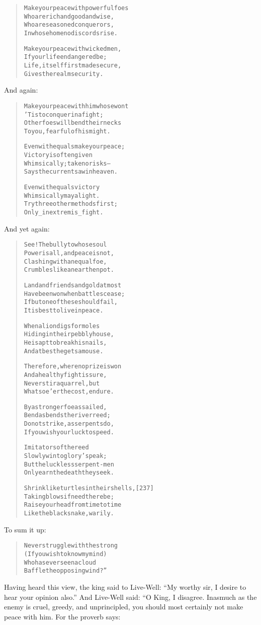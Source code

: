 \documentclass[article, twoside, 14pt]{memoir}
\renewenvironment{verbatim}{%
\begin{quote}%
\vskip -10pt%
\begin{alltt}\normalfont\large}{\end{alltt}%
\end{quote}%
\vskip -10pt
} %
\begin{document}
\begin{verbatim}
Make your peace with powerful foes
    Who are rich and good and wise,
Who are seasoned conquerors,
In whose home no discords rise.

Make your peace with wicked men,
    If your life endangered be;
Life, itself first made secure,
    Gives the realm security.
\end{verbatim}
And again:

\begin{verbatim}
Make your peace with him whose wont
    'Tis to conquer in a fight;
Other foes will bend their necks
    To you, fearful of his might.

Even with equals make your peace;
    Victory is often given
Whimsically; take no risks--
    Says the current saw in heaven.

Even with equals victory
    Whimsically may alight.
Try three other methods first;
    Only _in extremis_ fight.
\end{verbatim}
And yet again:

\begin{verbatim}
See! The bully to whose soul
    Power is all, and peace is not,
Clashing with an equal foe,
    Crumbles like an earthen pot.

Land and friends and gold at most
    Have been won when battles cease;
If but one of these should fail,
    It is best to live in peace.

When a lion digs for moles
    Hiding in their pebbly house,
He is apt to break his nails,
    And at best he gets a mouse.

Therefore, where no prize is won
    And a healthy fight is sure,
Never stir a quarrel, but
    Whatsoe'er the cost, endure.

By a stronger foe assailed,
    Bend as bends the river reed;
Do not strike, as serpents do,
    If you wish your luck to speed.

Imitators of the reed
    Slowly win to glory's peak;
But the luckless serpent-men
    Only earn the death they seek.

Shrink like turtles in their shells,                    [237]
    Taking blows if need there be;
Raise your head from time to time
    Like the black snake, warily.
\end{verbatim}
To sum it up:

\begin{verbatim}
Never struggle with the strong
    (If you wish to know my mind)
Who has ever seen a cloud
    Baffle the opposing wind?”
\end{verbatim}
Having heard this view, the king said to Live-Well:
``My worthy sir, I desire to hear your opinion also.'' And
Live-Well said: “O King, I disagree. Inasmuch as the enemy is
cruel, greedy, and unprincipled, you should most certainly not make
peace with him. For the proverb says:
\end{document}
